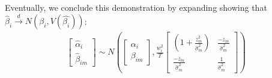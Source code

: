 \documentclass[]{article}
\begin{document}
Eventually, we conclude this demonstration by expanding showing that $\hat{\beta}_i \overset{d}{\to} N(\beta_i,V(\hat{\beta_i}))$:
\begin{align*}
	\begin{bmatrix} \hat{\alpha}_i \\ \hat{\beta}_{im} \end{bmatrix}
	\sim N(\begin{bmatrix} \alpha_i \\ \beta_{im} \end{bmatrix}, \frac{w_i^2}{T}\begin{bmatrix} (1 + \frac{\overline{z}_m^2}{\hat{\sigma}_{m}^2}) & \frac{-\overline{z}_m}{\hat{\sigma}_{m}^2} \\ \frac{-\overline{z}_m}{\hat{\sigma}_{m}^2} & \frac{1}{\hat{\sigma}_{m}^2} \end{bmatrix}) 
\end{align*}
\end{document}
